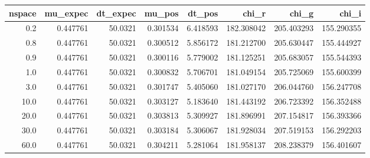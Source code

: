 \begin{tabular}{rrrrrrrr}
\toprule
 nspace &  mu\_expec &  dt\_expec &    mu\_pos &    dt\_pos &       chi\_r &       chi\_g &       chi\_i \\
\midrule
    0.2 &  0.447761 &   50.0321 &  0.301534 &  6.418593 &  182.308042 &  205.403293 &  155.290355 \\
    0.8 &  0.447761 &   50.0321 &  0.300512 &  5.856172 &  181.212700 &  205.630447 &  155.444927 \\
    0.9 &  0.447761 &   50.0321 &  0.300116 &  5.779002 &  181.125251 &  205.683057 &  155.544393 \\
    1.0 &  0.447761 &   50.0321 &  0.300832 &  5.706701 &  181.049154 &  205.725069 &  155.600399 \\
    3.0 &  0.447761 &   50.0321 &  0.301747 &  5.405060 &  181.027170 &  206.044760 &  156.247708 \\
   10.0 &  0.447761 &   50.0321 &  0.303127 &  5.183640 &  181.443192 &  206.723392 &  156.352488 \\
   20.0 &  0.447761 &   50.0321 &  0.303813 &  5.309927 &  181.896991 &  207.154817 &  156.393366 \\
   30.0 &  0.447761 &   50.0321 &  0.303184 &  5.306067 &  181.928034 &  207.519153 &  156.292203 \\
   60.0 &  0.447761 &   50.0321 &  0.304211 &  5.281064 &  181.958137 &  208.238379 &  156.401607 \\
\bottomrule
\end{tabular}
